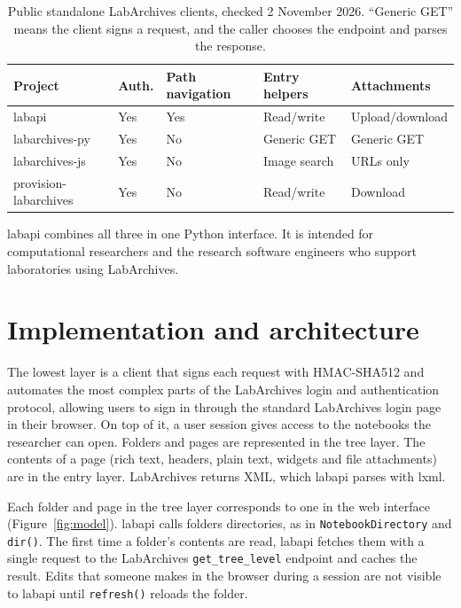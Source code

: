 \documentclass{jors}
\begin{document}
\begin{table}[htbp]
	\centering
	{\small
	\begin{tabular}{p{3.6cm}p{1.1cm}p{1.9cm}p{2.0cm}p{2.1cm}}
		\hline
		\textbf{Project} & \textbf{Auth.} & \textbf{Path navigation} & \textbf{Entry helpers} & \textbf{Attachments} \\
		\hline
		labapi & Yes & Yes & Read/write & Upload/download \\
		labarchives-py \citep{mcmero} & Yes & No & Generic GET & Generic GET \\
		labarchives-js \citep{marcellofuschi} & Yes & No & Image search & URLs only \\
		provision-labarchives \citep{provision_labarchives} & Yes & No & Read/write & Download \\
		\hline
	\end{tabular}}
	\caption{Public standalone LabArchives clients, checked 2 November 2026.
    ``Generic GET'' means the client signs a request, and the caller
    chooses the endpoint and parses the response.}
	\label{tab:comparison}
\end{table}

labapi combines all three in one Python interface. It is intended for
computational
researchers and the research software engineers who support laboratories
using LabArchives.

\section*{Implementation and architecture}

The lowest layer is a client that signs each request with HMAC-SHA512
and automates the most complex parts of the LabArchives login and
authentication protocol, allowing users to sign in through the standard
LabArchives login page in their browser. On top of it, a user session gives access to the notebooks
the researcher can open. Folders and pages are represented in the tree
layer. The contents of a page (rich text, headers, plain text, widgets and
file attachments) are in the entry layer. LabArchives returns XML, which
labapi parses with lxml.

Each folder and page in the tree layer corresponds to one in the web
interface (Figure~\ref{fig:model}). labapi calls folders directories, as in
\texttt{NotebookDirectory} and \texttt{dir()}. The first time a folder's
contents are read, labapi fetches them with a single request to the
LabArchives \texttt{get\_tree\_level} endpoint and caches the result. Edits
that someone makes in the browser
during a session are not visible to labapi until \texttt{refresh()} reloads
the folder.
\end{document}
